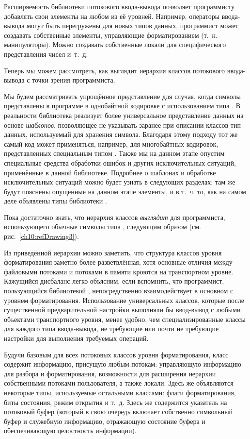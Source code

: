 Расширяемость библиотеки потокового ввода-вывода позволяет программисту добавлять свои элементы на любом из её уровней.
Например, операторы ввода-вывода могут быть перегружены для новых типов данных, программист может создавать собственные
элементы, управляющие форматированием (т.~н. манипуляторы). Можно создавать собственные локали для специфического
представления чисел и~т.~д. 

Теперь мы можем рассмотреть, как выглядит иерархия классов потокового ввода-вывода с точки зрения программиста. 

Мы будем рассматривать упрощённое представление для случая, когда символы представлены в программе в однобайтной
кодировке с использованием типа . В реальности библиотека 
реализует более универсальное представление данных на основе \emph{шаблонов}, позволяющее не
указывать заранее при описании классов тип данных, используемый для хранения символа. Благодаря этому подходу тот же
самый код может применяться, например, для многобайтных кодировок, представленных специальным типом
. Также мы на данном этапе опустим специальные средства обработки ошибок и других
исключительных ситуаций, применённые в данной библиотеке. Подробнее о шаблонах и обработке исключительных ситуаций
можно будет узнать в следующих разделах; там же будут пояснены опущенные на данном этапе элементы, и в т.~ч. то, как на
самом деле объявлены типы библиотеки . 

Пока достаточно знать, что иерархия классов  \emph{выглядит}
 для программиста, использующего обычные символы типа , следующим образом (см. рис.~\ref{ch10:refDrawing3}).

Из приведённой иерархии можно заметить, что структура классов уровня форматирования заметно более разветвлённая, хотя
основные отличия между файловыми потоками и потоками в памяти кроются на транспортном уровне. Кажущийся дисбаланс легко
объясним, если вспомнить, что программист, пользующийся библиотекой , непосредственно
взаимодействует в основном с уровнем форматирования. Использование универсальных классов, которые после существенной
предварительной настройки выполняли бы ввод-вывод с любыми объектами транспортного уровня, менее удобно, чем
специализированные классы для каждого типа ввода-вывода, не требующие или почти не требующие настройки для выполнения
требуемых операций.

Будучи базовым для всех потоковых классов уровня форматирования, класс  содержит информацию,
присущую любым потокам: управляющую информацию для разбора и форматирования, возможности для расширения иерархии
собственными потоками пользователя, а также локали. Здесь же объявляются некоторые типы, используемые остальными
классами: флаги форматирования, биты состояния, режим открытия и т.~д. Здесь же содержится указатель на потоковый буфер
(который в свою очередь включает собственно символьный буфер и служебную информацию, отражающую состояние буфера и
обеспечивающую целостность информации).

